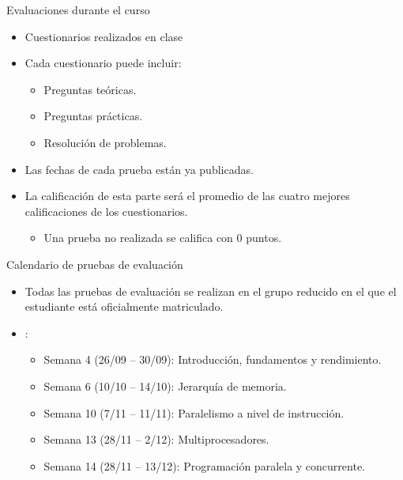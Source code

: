 \begin{frame}[t]{Evaluaciones durante el curso}
\begin{itemize}
  \item Cuestionarios realizados en clase
  \pause\vfill
  \item Cada cuestionario puede incluir:
    \begin{itemize}
      \item Preguntas teóricas.
      \item Preguntas prácticas.
      \item Resolución de problemas.
    \end{itemize}
  \pause\vfill
  \item Las fechas de cada prueba están ya publicadas.
  \pause\vfill
  \item La calificación de esta parte será el promedio de las cuatro mejores calificaciones
        de los cuestionarios. 
    \begin{itemize}
      \item Una prueba no realizada se califica con 0 puntos.
    \end{itemize}
\end{itemize}
\end{frame}

\begin{frame}[t]{Calendario de pruebas de evaluación}
\begin{itemize}
  \item Todas las pruebas de evaluación se realizan en el grupo reducido
        en el que el estudiante está oficialmente matriculado.

  \vfill
  \item {}:
  \begin{itemize}
    \item Semana 4 (26/09 -- 30/09): Introducción, fundamentos y rendimiento.
    \item Semana 6 (10/10 -- 14/10): Jerarquía de memoria.
    \item Semana 10 (7/11 -- 11/11): Paralelismo a nivel de instrucción.
    \item Semana 13 (28/11 -- 2/12): Multiprocesadores.
    \item Semana 14 (28/11 -- 13/12): Programación paralela y concurrente.
  \end{itemize}
\end{itemize}
\end{frame}


